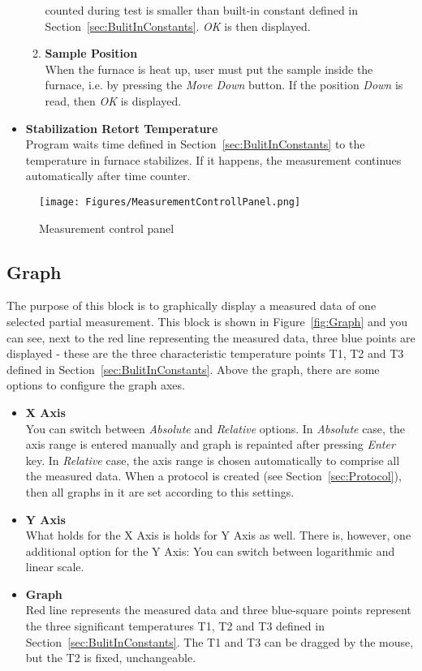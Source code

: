 \documentclass[a4paper,11pt,oneside]{report}
\theoremstyle{named}
\begin{document}
\begin{itemize}
\begin{enumerate}
        counted during test is smaller than built-in constant defined in
        Section~\ref{sec:BulitInConstants}. \textit{OK} is then displayed.
      \item \textbf{Sample Position} \\
        When the furnace is heat up, user must put the sample inside the
        furnace, i.e. by pressing the \textit{Move Down} button. If the position
        \textit{Down} is read, then \textit{OK} is displayed.
    \end{enumerate}
  \item \textbf{Stabilization Retort Temperature} \\
    Program waits time defined in Section~\ref{sec:BulitInConstants} to the
    temperature in furnace stabilizes. If it happens, the measurement continues
    automatically after time counter. 
\end{itemize}

\begin{figure}[t]
  \centering
  \texttt{[image: Figures/MeasurementControllPanel.png]}
  \caption{Measurement control panel}
  \label{fig:MeasurementControlPanel}
\end{figure}

\subsection{Graph}
\label{sec:Graph}

The purpose of this block is to graphically display a measured data of one
selected partial measurement. This block is shown in Figure~\ref{fig:Graph} and
you can see, next to the red line representing the measured data, three blue
points are displayed - these are the three characteristic temperature points T1,
T2 and T3 defined in Section~\ref{sec:BulitInConstants}. Above the graph, there
are some options to configure the graph axes. 

\begin{itemize}
  \item \textbf{X Axis} \\
    You can switch between \textit{Absolute} and \textit{Relative} options. In
    \textit{Absolute} case, the axis range is entered manually and graph is
    repainted after pressing \textit{Enter} key. In \textit{Relative} case, the
    axis range is chosen automatically to comprise all the measured data. When
    a protocol is created (see Section~\ref{sec:Protocol}), then all graphs
    in it are set according to this settings.
  \item \textbf{Y Axis} \\
    What holds for the X Axis is holds for Y Axis as well. There is, however,
    one additional option for the Y Axis: You can switch between logarithmic and
    linear scale.
  \item \textbf{Graph} \\
    Red line represents the measured data and three blue-square points represent
    the three significant temperatures T1, T2 and T3 defined in
    Section~\ref{sec:BulitInConstants}. The T1 and T3 can be dragged by the
    mouse, but the T2 is fixed, unchangeable.
\end{itemize}
\end{document}
